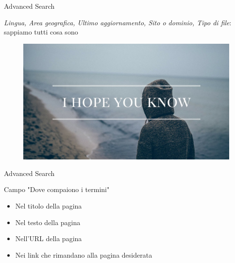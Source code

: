 \documentclass{beamer}
\begin{document}
\begin{frame}{Advanced Search}
\begin{center}
\textit{Lingua, Area geografica, Ultimo aggiornamento, Sito o dominio, Tipo di file}: sappiamo tutti cosa sono
\end{center}
\begin{figure}[h!]
\includegraphics[width=0.7\linewidth]{immagini/hope.jpg}
\end{figure}
\end{frame}

\begin{frame}{Advanced Search}
\begin{block}{\begin{center}Campo "Dove compaiono i termini"\end{center}}
\begin{itemize}
\item \begin{center}Nel titolo della pagina\end{center}
\item \begin{center}Nel testo della pagina\end{center}
\item \begin{center}Nell'URL della pagina\end{center}
\item \begin{center}Nei link che rimandano alla pagina desiderata\end{center}
\end{itemize}
\end{block}
\end{frame}
\end{document}
